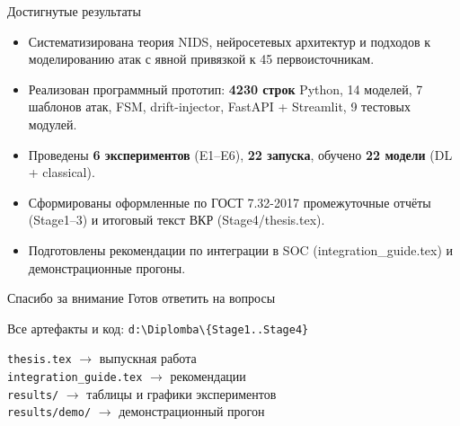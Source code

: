 \documentclass[14pt, aspectratio=169]{beamer}
\begin{document}
\begin{frame}{Достигнутые результаты}
\begin{itemize}
    \item Систематизирована теория NIDS, нейросетевых архитектур и
    подходов к моделированию атак с явной привязкой к 45 первоисточникам.
    \item Реализован программный прототип: \textbf{4230 строк} Python,
    14 моделей, 7 шаблонов атак, FSM, drift-injector, FastAPI +
    Streamlit, 9 тестовых модулей.
    \item Проведены \textbf{6 экспериментов} (E1--E6), \textbf{22 запуска},
    обучено \textbf{22 модели} (DL + classical).
    \item Сформированы оформленные по ГОСТ 7.32-2017 промежуточные
    отчёты (Stage1--3) и итоговый текст ВКР (Stage4/thesis.tex).
    \item Подготовлены рекомендации по интеграции в SOC
    (integration\_guide.tex) и демонстрационные прогоны.
\end{itemize}
\end{frame}

\begin{frame}{Спасибо за внимание}
\centering
\Huge Готов ответить на вопросы

\vspace{0.5cm}
\normalsize
Все артефакты и код:
\texttt{d:\textbackslash{}Diplomba\textbackslash{}\{Stage1..Stage4\}}

\texttt{thesis.tex} $\to$ выпускная работа\\
\texttt{integration\_guide.tex} $\to$ рекомендации\\
\texttt{results/} $\to$ таблицы и графики экспериментов\\
\texttt{results/demo/} $\to$ демонстрационный прогон
\end{frame}
\end{document}
